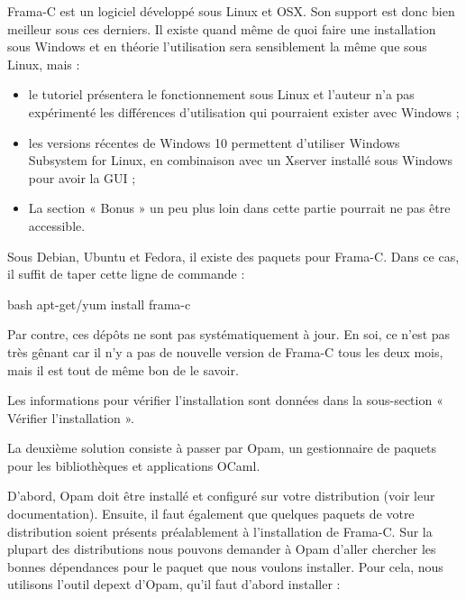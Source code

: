 Frama-C est un logiciel développé sous Linux et OSX. Son support est donc bien
meilleur sous ces derniers. Il existe quand même de quoi faire une installation
sous Windows et en théorie l'utilisation sera sensiblement la même que sous
Linux, mais :



\begin{Warning}
\begin{itemize}
\item le tutoriel présentera le fonctionnement sous Linux et l'auteur n'a pas
expérimenté les différences d'utilisation qui pourraient exister avec
Windows ;
\item les versions récentes de Windows 10 permettent d'utiliser Windows Subsystem
  for Linux, en combinaison avec un Xserver installé sous Windows pour avoir la
  GUI ;
\item La section « Bonus » un peu plus loin dans cette partie pourrait ne pas être
accessible.
\end{itemize}
\end{Warning}






Sous Debian, Ubuntu et Fedora, il existe des paquets pour Frama-C. Dans ce cas,
il suffit de taper cette ligne de commande :



\begin{CodeBlock}{bash}
apt-get/yum install frama-c
\end{CodeBlock}



Par contre, ces dépôts ne sont pas systématiquement à jour. En soi, ce n'est pas très gênant car il n'y a pas de nouvelle version de Frama-C tous les deux mois, mais il est tout de même bon de le savoir.



Les informations pour vérifier l'installation sont données dans la sous-section « Vérifier l'installation ».




La deuxième solution consiste à passer par Opam, un gestionnaire de paquets
pour les bibliothèques et applications OCaml.


D'abord, Opam doit être installé et configuré sur votre distribution (voir
leur documentation). Ensuite, il faut également que quelques paquets de votre
distribution soient présents préalablement à l'installation de Frama-C. Sur la
plupart des distributions nous pouvons demander à Opam d'aller chercher les
bonnes dépendances pour le paquet que nous voulons installer. Pour cela, nous
utilisons l'outil depext d'Opam, qu'il faut d'abord installer :



